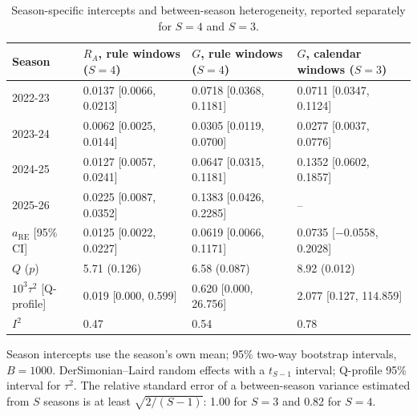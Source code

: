 \begin{table}[htbp]
\centering
\footnotesize
\caption{Season-specific intercepts and between-season heterogeneity, reported separately for $S=4$ and $S=3$.}
\label{tab:s5}
\begin{tabular}{llll}
\toprule
Season & $R_A$, rule windows ($S=4$) & $G$, rule windows ($S=4$) & $G$, calendar windows ($S=3$) \\
\midrule
2022-23 & 0.0137 [0.0066, 0.0213] & 0.0718 [0.0368, 0.1181] & 0.0711 [0.0347, 0.1124] \\
2023-24 & 0.0062 [0.0025, 0.0144] & 0.0305 [0.0119, 0.0700] & 0.0277 [0.0037, 0.0776] \\
2024-25 & 0.0127 [0.0057, 0.0241] & 0.0647 [0.0315, 0.1181] & 0.1352 [0.0602, 0.1857] \\
2025-26 & 0.0225 [0.0087, 0.0352] & 0.1383 [0.0426, 0.2285] & -- \\
$a_{\mathrm{RE}}$ [95\% CI] & 0.0125 [0.0022, 0.0227] & 0.0619 [0.0066, 0.1171] & 0.0735 [$-$0.0558, 0.2028] \\
$Q$ ($p$) & 5.71 (0.126) & 6.58 (0.087) & 8.92 (0.012) \\
$10^3\tau^2$ [Q-profile] & 0.019 [0.000, 0.599] & 0.620 [0.000, 26.756] & 2.077 [0.127, 114.859] \\
$I^2$ & 0.47 & 0.54 & 0.78 \\
\bottomrule
\end{tabular}
\par\smallskip
\begin{minipage}{0.95\linewidth}\scriptsize Season intercepts use the season's own mean; 95\% two-way bootstrap intervals, $B=1000$. DerSimonian--Laird random effects with a $t_{S-1}$ interval; Q-profile 95\% interval for $\tau^2$. The relative standard error of a between-season variance estimated from $S$ seasons is at least $\sqrt{2/(S-1)}$: 1.00 for $S=3$ and 0.82 for $S=4$.\end{minipage}
\end{table}
